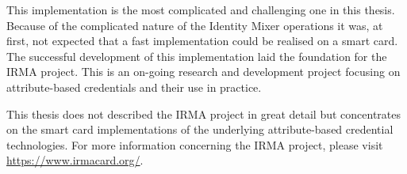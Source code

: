 This implementation is the most complicated and challenging one in this thesis.
Because of the complicated nature of the Identity Mixer operations it was, at
first, not expected that a fast implementation could be realised on a smart
card. The successful development of this implementation laid the foundation for
the IRMA project. This is an on-going research and development project focusing
on attribute-based credentials and their use in practice.

This thesis does not described the IRMA project in great detail but concentrates
on the smart card implementations of the underlying attribute-based credential
technologies. For more information concerning the IRMA project, please visit
\url{https://www.irmacard.org/}.
